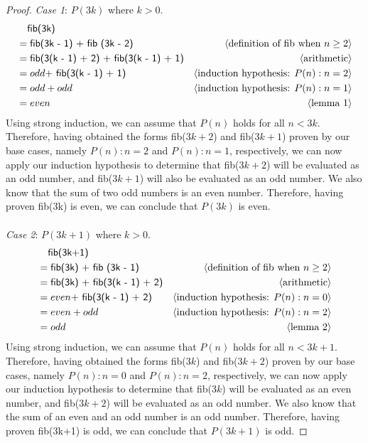 \documentclass[11pt,fleqn]{article}
\newcommand{\mname}[1]{\mbox{\sf #1}}
\newcommand{\pnote}[1]{{\langle \text{#1} \rangle}}
\begin{document}
\begin{enumerate}
\begin{proof}
    \emph{Case 1}: $P(3k)$ where $k > 0$.
    \begin{align*}
      &\phantom{{}=} \mname {fib(3k)} \\
      &= \mname{fib(3k - 1) + fib (3k - 2)}  & \pnote{definition of fib when $n \ge 2$}\\
      &= \mname{fib(3(k - 1) + 2) + fib(3(k - 1) + 1)}  & \pnote{arithmetic}\\
      &= odd \mname{ + fib(3(k - 1) + 1)}  & \pnote{induction hypothesis: $P(n): n = 2$}\\
      &= odd + odd  & \pnote{induction hypothesis: $P(n): n = 1$}\\
      &= even  & \pnote{lemma 1}
    \end{align*}
    Using strong induction, we can assume that $P(n)$ holds for all $n<3k$. Therefore, having obtained the forms fib($3k+2$) and fib($3k+1$) proven by our base cases, namely $P(n): n = 2$ and $P(n): n = 1$, respectively, we can now apply our induction hypothesis to determine that fib($3k +2$) will be evaluated as an odd number, and fib($3k + 1$) will also be evaluated as an odd number. We also know that the sum of two odd numbers is an even number. Therefore, having proven fib(3k) is even, we can conclude that $P(3k)$ is even.
    \\\\
    \emph{Case 2}: $P(3k+1)$ where $k > 0$.
    \begin{align*}
      &\phantom{{}=} \mname {fib(3k+1)} \\
      &= \mname{fib(3k) + fib (3k - 1)}  & \pnote{definition of fib when $n \ge 2$}\\
      &= \mname{fib(3k) + fib(3(k - 1) + 2)}  & \pnote{arithmetic}\\
      &= even \mname{ + fib(3(k - 1) + 2)}  & \pnote{induction hypothesis: $P(n): n = 0$}\\
      &= even + odd  & \pnote{induction hypothesis: $P(n): n = 2$}\\
      &= odd  & \pnote{lemma 2}
    \end{align*}
    Using strong induction, we can assume that $P(n)$ holds for all $n<3k+1$. Therefore, having obtained the forms fib($3k$) and fib($3k+2$) proven by our base cases, namely $P(n): n = 0$ and $P(n): n = 2$, respectively, we can now apply our induction hypothesis to determine that fib($3k$) will be evaluated as an even number, and fib($3k + 2$) will be evaluated as an odd number. We also know that the sum of an even and an odd number is an odd number. Therefore, having proven fib(3k+1) is odd, we can conclude that $P(3k+1)$ is odd.

\end{proof}
\end{enumerate}
\end{document}
